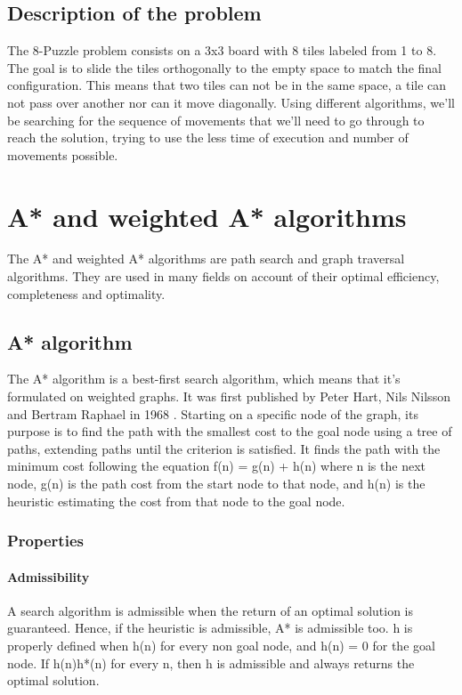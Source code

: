 \documentclass[runningheads]{llncs}
\begin{document}
\subsection{Description of the problem}
The 8-Puzzle problem consists on a 3x3 board with 8 tiles labeled from 1 to 8. The goal is to slide the tiles orthogonally to the empty space to match the final configuration. This means that two tiles can not be in the same space, a tile can not pass over another nor can it move diagonally.
Using different algorithms, we'll be searching for the sequence of movements that we'll need to go through to reach the solution, trying to use the less time of execution and number of movements possible.

\section{A* and weighted A* algorithms} \label{s:awa}
The A* and weighted A* algorithms are path search and graph traversal algorithms. They are used in many fields on account of their optimal efficiency, completeness and optimality.
\subsection{A* algorithm}
The A* algorithm is a best-first search algorithm, which means that it's formulated on weighted graphs. It was first published by Peter Hart, Nils Nilsson and Bertram Raphael in 1968 \cite{astar}. Starting on a specific node of the graph, its purpose is to find the path with the smallest cost to the goal node using a tree of paths, extending paths until the criterion is satisfied.
It finds the path with the minimum cost following the equation f(n) = g(n) + h(n) where n is the next node, g(n) is the path cost from the start node to that node, and h(n) is the heuristic estimating the cost from that node to the goal node.
\subsubsection{Properties}
\paragraph{Admissibility}
A search algorithm is admissible when the return of an optimal solution is guaranteed. Hence, if the heuristic is admissible, A* is admissible too. h is properly defined when h(n) for every non goal node, and h(n) = 0 for the goal node. If h(n)\leq h*(n) for every n, then h is admissible and always returns the optimal solution.
\end{document}
